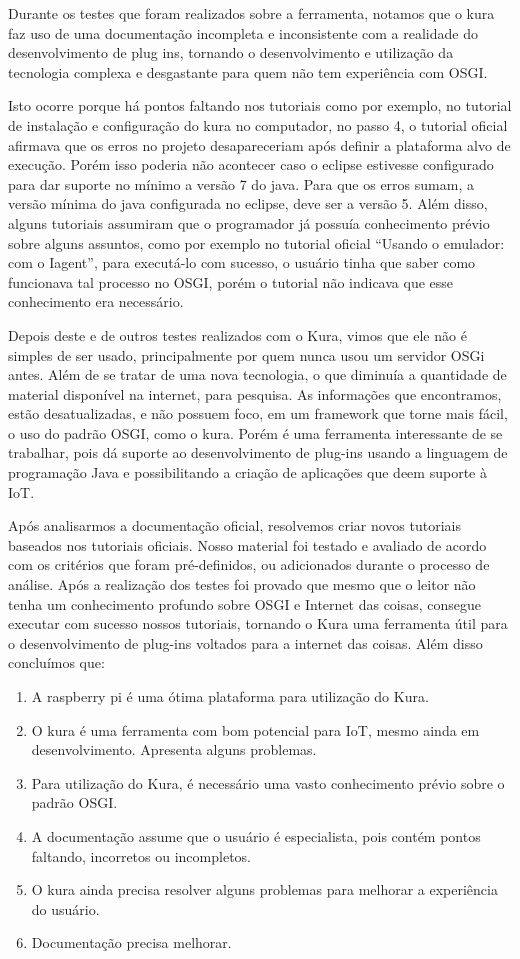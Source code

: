 Durante os testes que foram realizados sobre a ferramenta, notamos que o kura faz uso de uma documentação incompleta e inconsistente com a realidade do desenvolvimento de plug ins, tornando o desenvolvimento e utilização da tecnologia complexa e desgastante para quem não tem experiência com OSGI.

Isto ocorre porque há pontos faltando nos tutoriais como por exemplo, no tutorial de instalação e configuração do kura no computador, no passo 4, o tutorial oficial afirmava que os erros no projeto desapareceriam após definir a plataforma alvo de execução. Porém isso poderia não acontecer caso o eclipse estivesse configurado para dar suporte no mínimo a versão 7 do java. Para que os erros sumam, a versão mínima do java configurada no eclipse, deve ser a versão 5.
Além disso, alguns tutoriais assumiram que o programador já possuía conhecimento prévio sobre alguns assuntos, como por exemplo no tutorial oficial “Usando o emulador: com o Iagent”, para executá-lo com sucesso, o usuário tinha que saber como funcionava tal processo no OSGI, porém o tutorial não indicava que esse conhecimento era necessário.

Depois deste e de outros testes realizados com o Kura, vimos que ele não é simples de ser usado, principalmente por quem nunca usou um servidor OSGi antes. Além de se tratar de uma nova tecnologia, o que diminuía a quantidade de material disponível na internet, para pesquisa. As informações que encontramos, estão desatualizadas, e não possuem foco, em um framework que torne mais fácil, o uso do padrão OSGI, como o kura. Porém é uma ferramenta interessante de se trabalhar, pois dá suporte ao desenvolvimento de plug-ins usando a linguagem de programação Java e possibilitando a criação de aplicações que deem suporte à IoT.

Após analisarmos a documentação oficial, resolvemos criar novos tutoriais baseados nos tutoriais oficiais. Nosso material foi testado e avaliado de acordo com os critérios que foram pré-definidos, ou adicionados durante o processo de análise. Após a realização dos testes foi provado que mesmo que o leitor não tenha um conhecimento profundo sobre OSGI e Internet das coisas, consegue executar com sucesso nossos tutoriais, tornando o Kura uma ferramenta útil para o desenvolvimento de plug-ins voltados para a internet das coisas. Além disso concluímos que:

\begin{enumerate}
  \item A raspberry pi é uma ótima plataforma para utilização do Kura.
  \item O kura é uma ferramenta com bom potencial para IoT, mesmo ainda em desenvolvimento. Apresenta alguns problemas.
  \item Para utilização do Kura, é necessário uma vasto conhecimento prévio sobre o padrão OSGI.
  \item A documentação assume que o usuário é especialista, pois contém pontos faltando, incorretos ou incompletos.
  \item O kura ainda precisa resolver alguns problemas para melhorar a experiência do usuário.
  \item Documentação precisa melhorar.
\end{enumerate}
